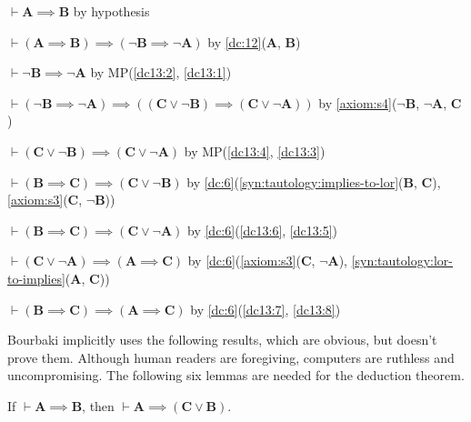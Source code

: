 \documentclass{amsart}%
\newcommand\metavariable[1]{\boldsymbol{#1}}
\begin{document}
\begin{pf}
\item\label{dc13:1} $\vdash\metavariable{A}\implies\metavariable{B}$ by hypothesis
\item\label{dc13:2} $\vdash(\metavariable{A}\implies\metavariable{B})\implies(\neg\metavariable{B}\implies\neg\metavariable{A})$
  by \ref{dc:12}($\metavariable{A}$, $\metavariable{B}$)
\item\label{dc13:3} $\vdash\neg\metavariable{B}\implies\neg\metavariable{A}$
  by MP(\ref{dc13:2}, \ref{dc13:1})
\item\label{dc13:4} $\vdash(\neg\metavariable{B}\implies\neg\metavariable{A})\implies((\metavariable{C}\lor\neg\metavariable{B})\implies(\metavariable{C}\lor\neg\metavariable{A}))$
  by \ref{axiom:s4}($\neg\metavariable{B}$, $\neg\metavariable{A}$, $\metavariable{C}$)
\item\label{dc13:5} $\vdash(\metavariable{C}\lor\neg\metavariable{B})\implies(\metavariable{C}\lor\neg\metavariable{A})$
  by MP(\ref{dc13:4}, \ref{dc13:3})
\item\label{dc13:6} $\vdash(\metavariable{B}\implies\metavariable{C})\implies(\metavariable{C}\lor\neg\metavariable{B})$
  by \ref{dc:6}(\ref{syn:tautology:implies-to-lor}($\metavariable{B}$, $\metavariable{C}$),
  \ref{axiom:s3}($\metavariable{C}$, $\neg\metavariable{B}$))
\item\label{dc13:7} $\vdash(\metavariable{B}\implies\metavariable{C})\implies(\metavariable{C}\lor\neg\metavariable{A})$
  by \ref{dc:6}(\ref{dc13:6}, \ref{dc13:5})
\item\label{dc13:8} $\vdash(\metavariable{C}\lor\neg\metavariable{A})\implies(\metavariable{A}\implies\metavariable{C})$
  by \ref{dc:6}(\ref{axiom:s3}($\metavariable{C}$, $\neg\metavariable{A}$),
  \ref{syn:tautology:lor-to-implies}($\metavariable{A}$, $\metavariable{C}$))
\item $\vdash(\metavariable{B}\implies\metavariable{C})\implies(\metavariable{A}\implies\metavariable{C})$
  by \ref{dc:6}(\ref{dc13:7}, \ref{dc13:8})
\end{pf}

Bourbaki implicitly uses the following results, which are obvious, but
doesn't prove them. Although human readers are foregiving, computers are
ruthless and uncompromising. The following six lemmas are needed for the
deduction theorem.

\begin{lemma}\label{lem:prop:weakening-l}
If $\vdash\metavariable{A}\implies\metavariable{B}$, then
$\vdash\metavariable{A}\implies(\metavariable{C}\lor\metavariable{B})$.
\end{lemma}
\end{document}
